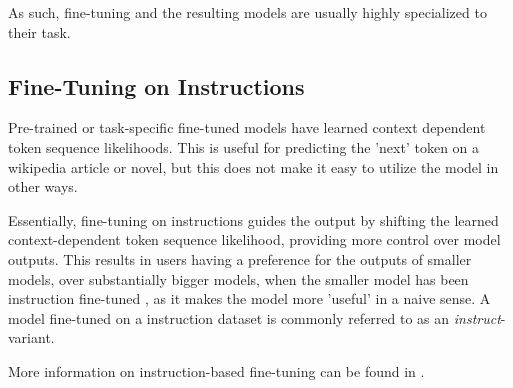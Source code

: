 As such, fine-tuning and the resulting models are usually highly specialized to their task.

\subsection{Fine-Tuning on Instructions}\label{sub:instruct}
Pre-trained or task-specific fine-tuned  models have learned context dependent token sequence likelihoods.
This is useful for predicting the 'next' token on a wikipedia article or novel, but this does not make it easy to utilize the model in other ways.

Essentially, fine-tuning on instructions guides the output by shifting the learned context-dependent token sequence likelihood, providing more control over model outputs.
This results in users having a preference for the outputs of smaller models, over substantially bigger models, when the smaller model has been instruction fine-tuned \cite{ouyang_training_2022}, as it makes the model more 'useful' in a naive sense.
A model fine-tuned on  a instruction dataset is commonly referred to as an \textit{instruct}-variant.

More information on instruction-based fine-tuning can be found in \cite{ouyang_training_2022, tirumala_d4_2023}.


